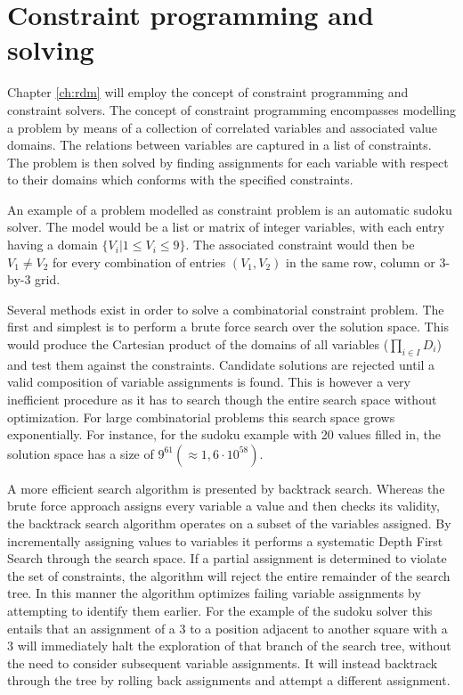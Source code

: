 \section{Constraint programming and solving}
\label{sec:back:constraint}
Chapter \ref{ch:rdm} will employ the concept of constraint programming and constraint solvers. The concept of constraint programming encompasses modelling a problem by means of a collection of correlated variables and associated value domains. The relations between variables are captured in a list of constraints. The problem is then solved by finding assignments for each variable with respect to their domains which conforms with the specified constraints. 

An example of a problem modelled as constraint problem is an automatic sudoku solver. The model would be a list or matrix of integer variables, with each entry having a domain $\{V_i|1\leq V_i\leq 9\}$. The associated constraint would then be $V_1 \neq V_2$ for every combination of entries $(V_1,V_2)$ in the same row, column or 3-by-3 grid.

Several methods exist in order to solve a combinatorial constraint problem. The first and simplest is to perform a brute force search over the solution space. This would produce the Cartesian product of the domains of all variables ($\prod_{i\in I} D_i$) and test them against the constraints. Candidate solutions are rejected until a valid composition of variable assignments is found. This is however a very inefficient procedure as it has to search though the entire search space without optimization. For large combinatorial problems this search space grows exponentially. For instance, for the sudoku example with 20 values filled in, the solution space has a size of $9^{61}(\approx 1,6\cdot 10^{58})$.

A more efficient search algorithm is presented by backtrack search. Whereas the brute force approach assigns every variable a value and then checks its validity, the backtrack search algorithm operates on a subset of the variables assigned. By incrementally assigning values to variables it performs a systematic Depth First Search through the search space. If a partial assignment is determined to violate the set of constraints, the algorithm will reject the entire remainder of the search tree. In this manner the algorithm optimizes failing variable assignments by attempting to identify them earlier. For the example of the sudoku solver this entails that an assignment of a 3 to a position adjacent to another square with a 3 will immediately halt the exploration of that branch of the search tree, without the need to consider subsequent variable assignments. It will instead backtrack through the tree by rolling back assignments and attempt a different assignment.

